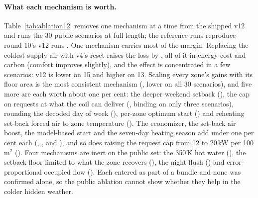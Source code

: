\documentclass{article}
\begin{document}
\paragraph{What each mechanism is worth.} Table~\ref{tab:ablation12} removes one mechanism at a time from the shipped v12 and runs the 30 public scenarios at full length; the reference runs reproduce round 10's v12 runs \RElvAbRefMatch. One mechanism carries most of the margin. Replacing the coldest supply air with v4's reset raises the loss by \RElvAbSatRel, all of it in energy cost and carbon (comfort improves slightly), and the effect is concentrated in a few scenarios: v12 is lower on 15 and higher on 13. Scaling every zone's gains with its floor area is the most consistent mechanism (\RElvAbNoareaRel, lower on all 30 scenarios), and five more are each worth about one per cent: the deeper weekend setback (\RElvAbNoweekendRel), the cap on requests at what the coil can deliver (\RElvAbNowcapRel, binding on only three scenarios), rounding the decoded day of week (\RElvAbNodowRel), per-zone optimum start (\RElvAbNozoneRel) and reheating set-back forced air to zone temperature (\RElvAbNoneutralRel). The economizer, the set-back air boost, the model-based start and the seven-day heating season add under one per cent each (\RElvAbNoeconRel, \RElvAbNoboostRel, \RElvAbNomodelRel{} and \RElvAbNoseasonRel), and so does raising the request cap from 12 to 20\,kW per 100\,m$^2$ (\RElvAbQcapRel). Four mechanisms are inert on the public set: the 350\,K hot water (\RElvAbTwRel), the setback floor limited to what the zone recovers (\RElvAbNofloorRel), the night flush (\RElvAbNoflushRel) and error-proportional occupied flow (\RElvAbNooccdynRel). Each entered as part of a bundle and none was confirmed alone, so the public ablation cannot show whether they help in the colder hidden weather.




\end{document}
